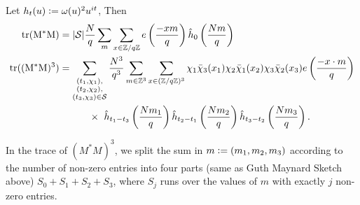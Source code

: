 \begin{corollary}
    Let $h_t(u)\mathrel{\mathop:}=\omega(u)^2u^{it}$,
    Then \begin{align*}
        \rm{tr}(M^*M) &= |\mathcal{S}|\frac{N}{q}\sum_{m}\sum_{x\in \mathbb{Z}/q\mathbb{Z}}e\left(\frac{-xm}{q}\right)\hat{h}_0\left(\frac{Nm}{q}\right)\\
        \rm{tr}((M^*M)^3)&=\sum_{\substack{(t_1,\chi_1),\\(t_2,\chi_2),\\(t_3,\chi_3)\in\mathcal{S}}}
        \frac{N^3}{q^3}\sum_{m\in\mathbb{Z}^3}\sum_{x\in (\mathbb{Z}/q\mathbb{Z})^3}\chi_1\bar{\chi}_3(x_1)\chi_2\bar{\chi}_1(x_2)\chi_3\bar{\chi}_2(x_3) e\left(\frac{-x\cdot m}{q}\right)\\
        & \quad \quad \quad \times \ \hat{h}_{t_1-t_3}\left(\frac{Nm_1}{q}\right)\hat{h}_{t_2-t_1}\left(\frac{Nm_2}{q}\right)\hat{h}_{t_3-t_2}\left(\frac{Nm_3}{q}\right).
    \end{align*}
\end{corollary}
In the trace of $(M^*M)^3$, we split the sum in $m\mathrel{\mathop:}= (m_1,m_2,m_3)$ according to the number of non-zero entries into four parts (same as Guth Maynard Sketch above) $S_0+ S_1+S_2+S_3$,
where $S_j$ runs over the values of $m$ with exactly $j$ non-zero entries.

